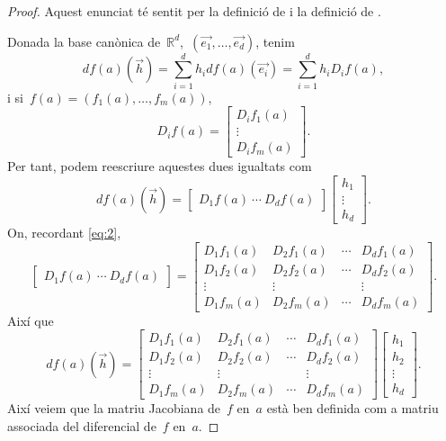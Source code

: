 \documentclass[../../main.tex]{subfiles}
\begin{document}
    \begin{proof}
        Aquest enunciat té sentit per la definició de  i la definició de .

        Donada la base canònica de~\(\mathbb{R}^{d}\),~\((\vec{e_{1}},\dots,\vec{e_{d}})\), tenim
        \[
            df(a)(\vec{h})=\sum_{i=1}^{d}h_{i}df(a)(\vec{e_{i}})=\sum_{i=1}^{d}h_{i}D_{i}f(a),
        \]
        i si~\(f(a)=(f_{1}(a),\dots,f_{m}(a))\),
        \begin{equation}\label{eq:2}
        D_{i}f(a)=
        \left[\begin{matrix}
        D_{i}f_{1}(a)\\
        \vdots\\
        D_{i}f_{m}(a)
        \end{matrix}\right].
        \end{equation}
        Per tant, podem reescriure aquestes dues igualtats com
        \[df(a)(\vec{h})=
        \left[\begin{matrix}
        D_{1}f(a)~\cdots~D_{d}f(a)
        \end{matrix}\right]
        \left[\begin{matrix}
        h_{1}\\\vdots\\h_{d}
        \end{matrix}
        \right].\]
        On, recordant \eqref{eq:2},
        \[\left[\begin{matrix}
        D_{1}f(a)~\cdots~D_{d}f(a)
        \end{matrix}\right]=
        \left[\begin{matrix}
        D_{1}f_{1}(a) & D_{2}f_{1}(a) & \cdots & D_{d}f_{1}(a)\\
        D_{1}f_{2}(a) & D_{2}f_{2}(a) & \cdots & D_{d}f_{2}(a)\\
        \vdots & \vdots && \vdots \\
        D_{1}f_{m}(a) & D_{2}f_{m}(a) & \cdots & D_{d}f_{m}(a)
        \end{matrix}\right].\]
        Així que
        \[df(a)(\vec{h})=
        \left[\begin{matrix}
        D_{1}f_{1}(a) & D_{2}f_{1}(a) & \cdots & D_{d}f_{1}(a)\\
        D_{1}f_{2}(a) & D_{2}f_{2}(a) & \cdots & D_{d}f_{2}(a)\\
        \vdots & \vdots && \vdots \\
        D_{1}f_{m}(a) & D_{2}f_{m}(a) & \cdots & D_{d}f_{m}(a)
        \end{matrix}\right]
        \left[\begin{matrix}
        h_{1}\\h_{2}\\\vdots\\h_{d}
        \end{matrix}
        \right].\]
        Així veiem que la matriu Jacobiana de~\(f\) en~\(a\) està ben definida com a matriu associada del diferencial de~\(f\) en~\(a\).
    \end{proof}
\end{document}
